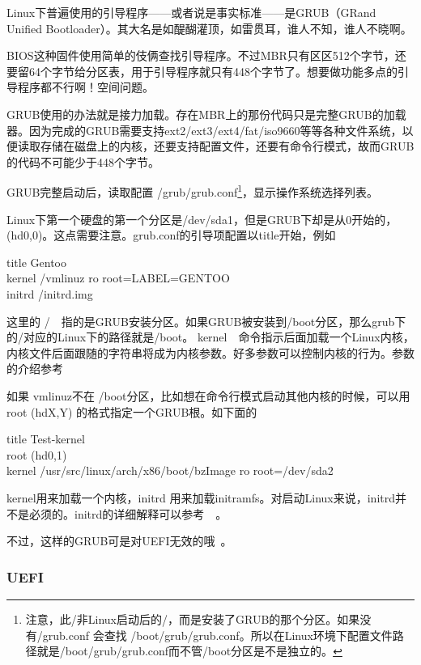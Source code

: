 Linux下普遍使用的引导程序——或者说是事实标准——是GRUB（GRand Unified Bootloader）。其大名是如醍醐灌顶，如雷贯耳，谁人不知，谁人不晓啊。

BIOS这种固件使用简单的伎俩查找引导程序。不过MBR只有区区512个字节，还要留64个字节给分区表，用于引导程序就只有448个字节了。想要做功能多点的引导程序都不行啊！空间问题。

GRUB使用的办法就是接力加载。存在MBR上的那份代码只是完整GRUB的加载器。因为完成的GRUB需要支持ext2/ext3/ext4/fat/iso9660等等各种文件系统，以便读取存储在磁盘上的内核，还要支持配置文件，还要有命令行模式，故而GRUB的代码不可能少于448个字节。

GRUB完整启动后，读取配置 /grub/grub.conf\footnote{注意，此/非Linux启动后的/，而是安装了GRUB的那个分区。如果没有/grub.conf 会查找 /boot/grub/grub.conf。所以在Linux环境下配置文件路径就是/boot/grub/grub.conf而不管/boot分区是不是独立的。}，显示操作系统选择列表。

Linux下第一个硬盘的第一个分区是/dev/sda1，但是GRUB下却是从0开始的，(hd0,0)。这点需要注意。grub.conf的引导项配置以title开始，例如

\begin{code}
title Gentoo\\
kernel /vmlinuz ro root=LABEL=GENTOO\\
initrd /initrd.img
\end{code}

这里的 /　指的是GRUB安装分区。如果GRUB被安装到/boot分区，那么grub下的/对应的Linux下的路径就是/boot。
kernel　命令指示后面加载一个Linux内核，内核文件后面跟随的字符串将成为内核参数。好多参数可以控制内核的行为。参数的介绍参考　

如果 vmlinuz不在 /boot分区，比如想在命令行模式启动其他内核的时候，可以用　root (hdX,Y) 的格式指定一个GRUB根。如下面的

\begin{code}
title Test-kernel\\
root (hd0,1)\\
kernel /usr/src/linux/arch/x86/boot/bzImage ro root=/dev/sda2
\end{code}

kernel用来加载一个内核，initrd 用来加载initramfs。对启动Linux来说，initrd并不是必须的。initrd的详细解释可以参考　。

不过，这样的GRUB可是对UEFI无效的哦~。

\subsubsection{UEFI}

